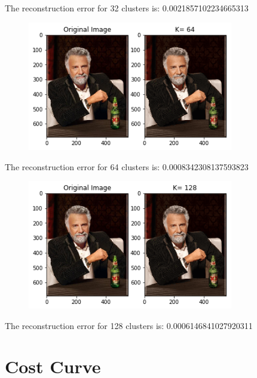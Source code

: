 \documentclass[11pt]{article}
\begin{document}
The reconstruction error for 32 clusters is: 0.0021857102234665313

    
    \begin{figure}[H]
		\centering
		\includegraphics[width=0.8\textwidth]{./Project_2_files/Project_2_33_15.png}
	\end{figure}


The reconstruction error for 64 clusters is: 0.0008342308137593823

    
    \begin{figure}[H]
		\centering
		\includegraphics[width=0.8\textwidth]{./Project_2_files/Project_2_33_18.png}
	\end{figure}

The reconstruction error for 128 clusters is: 0.0006146841027920311
\newline 

 \section{Cost Curve}
\end{document}
